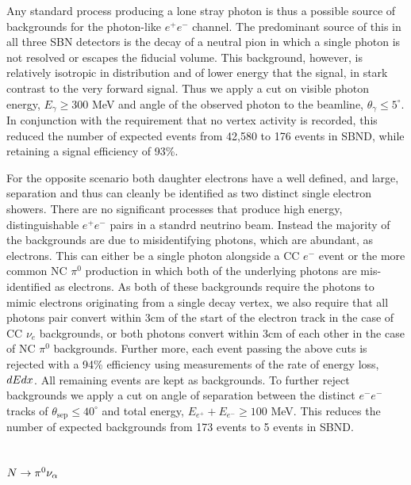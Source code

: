 \documentclass[11pt, a4paper]{article}
\def\ster{\ensuremath N}
\begin{document}
Any standard process producing a lone stray photon is thus a possible source of
backgrounds for the photon-like $e^+e^-$ channel. The predominant source of
this in all three SBN detectors is the decay of a neutral pion in which a
single photon is not resolved or escapes the fiducial volume. This background,
however, is relatively isotropic in distribution and of lower energy that the
signal, in stark contrast to the very forward signal. Thus we apply a cut on
visible photon energy, $E_\gamma \geq 300 $ MeV and angle of the observed
photon to the beamline, $\theta_\gamma \leq 5^\circ$. In conjunction with the
requirement that no vertex activity is recorded, this reduced the number of
expected events from 42,580 to 176 events in SBND, while retaining a signal
efficiency of 93\%.

For the opposite scenario both daughter electrons have a well defined, and
large, separation and thus can cleanly be identified as two distinct single
electron showers. There are no significant processes that produce high energy,
distinguishable $e^+e^-$ pairs in a standrd neutrino beam.  Instead the
majority of the backgrounds are due to misidentifying photons, which are
abundant, as electrons. This can either be a single photon alongside a CC $e^-$
event or the more common NC $\pi^0$ production in which both of the underlying
photons are mis-identified as electrons. As both of these backgrounds require
the photons to mimic electrons originating from a single decay vertex, we also
require that all photons pair convert within 3cm of the start of the electron
track in the case of CC $\nu_e$ backgrounds, or both photons convert within 3cm
of each other in the case of NC $\pi^0$ backgrounds. Further more, each event
passing the above cuts is rejected with a 94\% efficiency using measurements of
the rate of energy loss, $dE\/dx$. All remaining events are kept as
backgrounds. To further reject backgrounds we apply a cut on angle of
separation between the distinct $e^-e^-$ tracks of $\theta_\text{sep}\leq 40
^\circ$ and total energy, $E_{e^+}+E_{e^-} \geq 100$ MeV. This reduces the
number of expected backgrounds from 173 events to 5 events in SBND. 

\subsection{$\ster\rightarrow \pi^0 \nu_\alpha$}
\end{document}
